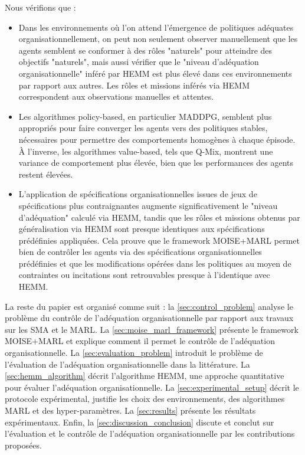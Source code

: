 \documentclass[sigconf,anonymous]{aamas}
\begin{document}
\noindent Nous vérifions que :
\begin{itemize}
  \item Dans les environnements où l'on attend l'émergence de politiques adéquates organisationnellement, on peut non seulement observer manuellement que les agents semblent se conformer à des rôles "naturels" pour atteindre des objectifs "naturels", mais aussi vérifier que le "niveau d'adéquation organisationnelle" inféré par HEMM est plus élevé dans ces environnements par rapport aux autres. Les rôles et missions inférés via HEMM correspondent aux observations manuelles et attentes.
  \item Les algorithmes policy-based, en particulier MADDPG, semblent plus appropriés pour faire converger les agents vers des politiques stables, nécessaires pour permettre des comportements homogènes à chaque épisode. À l'inverse, les algorithmes value-based, tels que Q-Mix, montrent une variance de comportement plus élevée, bien que les performances des agents restent élevées.
  \item L'application de spécifications organisationnelles issues de jeux de spécifications plus contraignantes augmente significativement le "niveau d'adéquation" calculé via HEMM, tandis que les rôles et missions obtenus par généralisation via HEMM sont presque identiques aux spécifications prédéfinies appliquées. Cela prouve que le framework MOISE+MARL permet bien de contrôler les agents via des spécifications organisationnelles prédéfinies et que les modifications opérées dans les politiques au moyen de contraintes ou incitations sont retrouvables presque à l'identique avec HEMM.
\end{itemize}

La reste du papier est organisé comme suit : la \autoref{sec:control_problem} analyse le problème du contrôle de l'adéquation organisationnelle par rapport aux travaux sur les SMA et le MARL. La \autoref{sec:moise_marl_framework} présente le framework MOISE+MARL et explique comment il permet le contrôle de l'adéquation organisationnelle. La \autoref{sec:evaluation_problem} introduit le problème de l'évaluation de l'adéquation organisationnelle dans la littérature. La \autoref{sec:hemm_algorithm} décrit l'algorithme HEMM, une approche quantitative pour évaluer l'adéquation organisationnelle. La \autoref{sec:experimental_setup} décrit le protocole expérimental, justifie les choix des environnements, des algorithmes MARL et des hyper-paramètres. La \autoref{sec:results} présente les résultats expérimentaux. Enfin, la \autoref{sec:discussion_conclusion} discute et conclut sur l'évaluation et le contrôle de l'adéquation organisationnelle par les contributions proposées.
\end{document}
